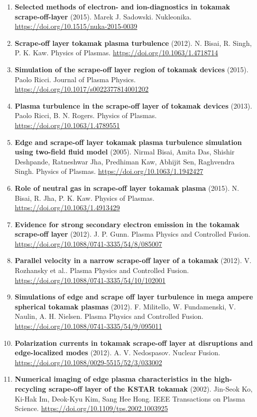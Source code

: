 \documentclass[11pt,a4paper]{article}
\begin{document}
\begin{enumerate}[leftmargin=1.4em]
\item \textbf{Selected methods of electron- and ion-diagnostics in tokamak scrape-off-layer} (2015). Marek J. Sadowski. Nukleonika. \url{https://doi.org/10.1515/nuka-2015-0039}
\item \textbf{Scrape-off layer tokamak plasma turbulence} (2012). N. Bisai, R. Singh, P. K. Kaw. Physics of Plasmas. \url{https://doi.org/10.1063/1.4718714}
\item \textbf{Simulation of the scrape-off layer region of tokamak devices} (2015). Paolo Ricci. Journal of Plasma Physics. \url{https://doi.org/10.1017/s0022377814001202}
\item \textbf{Plasma turbulence in the scrape-off layer of tokamak devices} (2013). Paolo Ricci, B. N. Rogers. Physics of Plasmas. \url{https://doi.org/10.1063/1.4789551}
\item \textbf{Edge and scrape-off layer tokamak plasma turbulence simulation using two-field fluid model} (2005). Nirmal Bisai, Amita Das, Shishir Deshpande, Ratneshwar Jha, Predhiman Kaw, Abhijit Sen, Raghvendra Singh. Physics of Plasmas. \url{https://doi.org/10.1063/1.1942427}
\item \textbf{Role of neutral gas in scrape-off layer tokamak plasma} (2015). N. Bisai, R. Jha, P. K. Kaw. Physics of Plasmas. \url{https://doi.org/10.1063/1.4913429}
\item \textbf{Evidence for strong secondary electron emission in the tokamak scrape-off layer} (2012). J. P. Gunn. Plasma Physics and Controlled Fusion. \url{https://doi.org/10.1088/0741-3335/54/8/085007}
\item \textbf{Parallel velocity in a narrow scrape-off layer of a tokamak} (2012). V. Rozhansky et al.. Plasma Physics and Controlled Fusion. \url{https://doi.org/10.1088/0741-3335/54/10/102001}
\item \textbf{Simulations of edge and scrape off layer turbulence in mega ampere spherical tokamak plasmas} (2012). F. Militello, W. Fundamenski, V. Naulin, A. H. Nielsen. Plasma Physics and Controlled Fusion. \url{https://doi.org/10.1088/0741-3335/54/9/095011}
\item \textbf{Polarization currents in tokamak scrape-off layer at disruptions and edge-localized modes} (2012). A. V. Nedospasov. Nuclear Fusion. \url{https://doi.org/10.1088/0029-5515/52/3/033002}
\item \textbf{Numerical imaging of edge plasma characteristics in the high-recycling scrape-off layer of the KSTAR tokamak} (2002). Jin-Seok Ko, Ki-Hak Im, Deok-Kyu Kim, Sang Hee Hong. IEEE Transactions on Plasma Science. \url{https://doi.org/10.1109/tps.2002.1003925}

\end{enumerate}
\end{document}
